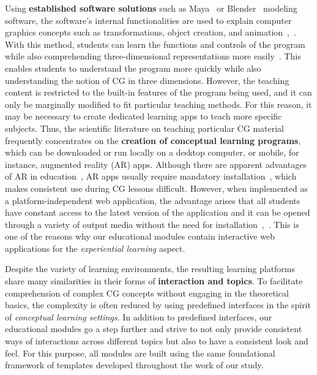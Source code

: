 Using \textbf{established software solutions} such as Maya~\cite{maya:2024:software} or Blender~\cite{blender:2024:documentation} modeling software, the software's internal functionalities are used to explain computer graphics concepts such as transformations, object creation, and animation~\cite{Elyan:2012:cg-tool},~\cite{Kadam:2013:cg-tool}. With this method, students can learn the functions and controls of the program while also comprehending three-dimensional representations more easily~\cite{Kadam:2013:cg-tool}. This enables students to understand the program more quickly while also understanding the notion of CG in three dimensions. However, the teaching content is restricted to the built-in features of the program being used, and it can only be marginally modified to fit particular teaching methods. For this reason, it may be necessary to create dedicated learning apps to teach more specific subjects. Thus, the scientific literature on teaching particular CG material frequently concentrates on the \textbf{creation of conceptual learning programs}, which can be downloaded or run locally on a desktop computer, or mobile, for instance, augmented reality (AR) apps.
Although there are apparent advantages of AR in education~\cite{wu:2013:current}\cite{lilligreen:2019:AWI}\cite{lilligreen:2019:EuroVR}, AR apps usually require mandatory installation~\cite{Qiao:2019:disadvantage-of-ar}, which makes consistent use during CG lessons difficult. However, when implemented as a platform-independent web application, the advantage arises that all students have constant access to the latest version of the application and it can be opened through a variety of output media without the need for installation~\cite{Eisemann:2023:cg-tool},~\cite{angel:2017:interactive}.  This is one of the reasons why our educational modules contain interactive web applications for the \emph {experiential learning} aspect.


Despite the variety of learning environments, the resulting learning platforms share many similarities in their forms of \textbf{interaction and topics}. To facilitate comprehension of complex CG concepts without engaging in the theoretical basics, the complexity is often reduced by using predefined interfaces in the spirit of \emph{conceptual learning settings}. In addition to predefined interfaces, our educational modules go a step further and strive to not only provide consistent ways of interactions across different topics but also to have a consistent look and feel. For this purpose, all modules are built using the same foundational framework of templates developed throughout the work of our study.

